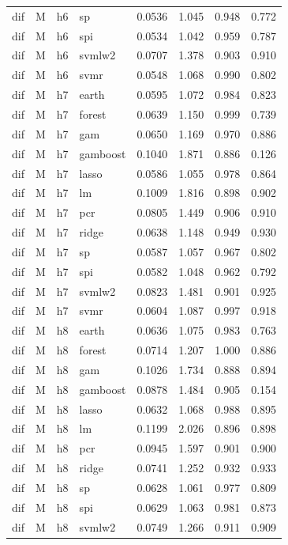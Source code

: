 \begin{ThreePartTable}
\begin{longtable}[t]{llclcccc}
dif & M & h6 & sp & 0.0536 & 1.045 & 0.948 & 0.772\\
dif & M & h6 & spi & 0.0534 & 1.042 & 0.959 & 0.787\\
dif & M & h6 & svmlw2 & 0.0707 & 1.378 & 0.903 & 0.910\\
dif & M & h6 & svmr & 0.0548 & 1.068 & 0.990 & 0.802\\
\addlinespace
dif & M & h7 & earth & 0.0595 & 1.072 & 0.984 & 0.823\\
dif & M & h7 & forest & 0.0639 & 1.150 & 0.999 & 0.739\\
dif & M & h7 & gam & 0.0650 & 1.169 & 0.970 & 0.886\\
dif & M & h7 & gamboost & 0.1040 & 1.871 & 0.886 & 0.126\\
dif & M & h7 & lasso & 0.0586 & 1.055 & 0.978 & 0.864\\
dif & M & h7 & lm & 0.1009 & 1.816 & 0.898 & 0.902\\
dif & M & h7 & pcr & 0.0805 & 1.449 & 0.906 & 0.910\\
dif & M & h7 & ridge & 0.0638 & 1.148 & 0.949 & 0.930\\
dif & M & h7 & sp & 0.0587 & 1.057 & 0.967 & 0.802\\
dif & M & h7 & spi & 0.0582 & 1.048 & 0.962 & 0.792\\
dif & M & h7 & svmlw2 & 0.0823 & 1.481 & 0.901 & 0.925\\
dif & M & h7 & svmr & 0.0604 & 1.087 & 0.997 & 0.918\\
\addlinespace
dif & M & h8 & earth & 0.0636 & 1.075 & 0.983 & 0.763\\
dif & M & h8 & forest & 0.0714 & 1.207 & 1.000 & 0.886\\
dif & M & h8 & gam & 0.1026 & 1.734 & 0.888 & 0.894\\
dif & M & h8 & gamboost & 0.0878 & 1.484 & 0.905 & 0.154\\
dif & M & h8 & lasso & 0.0632 & 1.068 & 0.988 & 0.895\\
dif & M & h8 & lm & 0.1199 & 2.026 & 0.896 & 0.898\\
dif & M & h8 & pcr & 0.0945 & 1.597 & 0.901 & 0.900\\
dif & M & h8 & ridge & 0.0741 & 1.252 & 0.932 & 0.933\\
dif & M & h8 & sp & 0.0628 & 1.061 & 0.977 & 0.809\\
dif & M & h8 & spi & 0.0629 & 1.063 & 0.981 & 0.873\\
dif & M & h8 & svmlw2 & 0.0749 & 1.266 & 0.911 & 0.909\\

\end{longtable}
\end{ThreePartTable}

